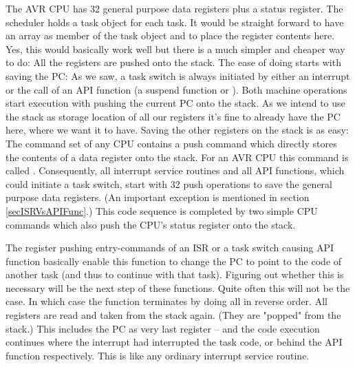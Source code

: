 The AVR CPU has 32 general purpose data registers plus a status register.
The scheduler holds a task object for each task. It would be straight
forward to have an array  as member of the
task object and to place the register contents here. Yes, this would
basically work well but there is a much simpler and cheaper way to do: All
the registers are pushed onto the stack. The ease of doing starts with
saving the PC: As we saw, a task switch is always initiated by either an
interrupt or the call of an API function (a suspend function or
). Both machine operations start execution with
pushing the current PC onto the stack. As we intend to use the stack as
storage location of all our registers it's fine to already have the PC
here, where we want it to have. Saving the other registers on the stack is
as easy: The command set of any CPU contains a push command which directly
stores the contents of a data register onto the stack. For an AVR CPU this
command is called . Consequently, all interrupt service
routines and all API functions, which could initiate a task switch, start
with 32 push operations to save the general purpose data registers. (An
important exception is mentioned in section \ref{secISRVsAPIFunc}.) This
code sequence is completed by two simple CPU commands which also push the
CPU's status register onto the stack.

The register pushing entry-commands of an ISR or a task switch causing API
function basically enable this function to change the PC to point to the
code of another task (and thus to continue with that task). Figuring out
whether this is necessary will be the next step of these functions. Quite
often this will not be the case. In which case the function terminates by
doing all in reverse order. All registers are read and taken from the
stack again. (They are "popped" from the stack.) This includes the PC as
very last register -- and the code execution continues where the interrupt
had interrupted the task code, or behind the API function respectively.
This is like any ordinary interrupt service routine.

